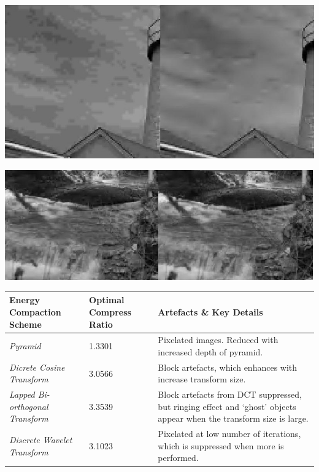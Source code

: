 \documentclass[a4paper, 11pt]{article}
\newenvironment{Figure}
  {\par\medskip\noindent\minipage{\linewidth}}
  {\endminipage\par\medskip}
\begin{document}
\begin{multicols}{2}
\begin{Figure}
\includegraphics[width=1.0\linewidth, center]{z_dwt_1_5.jpg}
\end{Figure}

\begin{Figure}
\includegraphics[width=1.0\linewidth, center]{mse_const.jpg}
\end{Figure}
\end{multicols}

\small
\begin{center}
\begin{tabular}{|l|l|p{7cm}|}
\hline
\textbf{Energy Compaction Scheme} & \textbf{Optimal Compress Ratio} & \textbf{Artefacts \& Key Details} \\
\hline
\textit{Pyramid} & 1.3301 & Pixelated images. Reduced with increased depth of pyramid.\\
\hline
\textit{Dicrete Cosine Transform} & 3.0566 & Block artefacts, which enhances with increase transform size. \\
\hline
\textit{Lapped Bi-orthogonal Transform} & 3.3539 & Block artefacts from DCT suppressed, but ringing effect and `ghost' objects appear when the transform size is large. \\
\hline
\textit{Discrete Wavelet Transform} & 3.1023 & Pixelated at low number of iterations, which is suppressed when more is performed. \\
\hline
\end{tabular}
\end{center}
\end{document}
